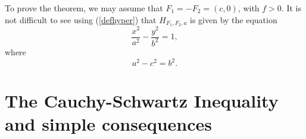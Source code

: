 \documentclass[]{stml-l}
\numberwithin{equation}{chapter}
\theoremstyle{plain}
\newtheorem{theorem}[equation]{Theorem}
\theoremstyle{definition}
\theoremstyle{remark}
\begin{document}
To prove the theorem, we may assume that $F_1=-F_2=(c,0)$, with $f>0$. It is not difficult to see using (\ref{defhyper}) that $H_{F_1,F_2,a} $ is given by the equation 
$$ \frac{x^2}{a^2}-\frac{y^2}{b^2}=1, $$ where 
$$ a^2-c^2=b^2.$$









%


%


%


%


\chapter[The Cauchy-Schwartz Inequality]{The Cauchy-Schwartz Inequality and simple consequences} \label{CS.append}
\end{document}
